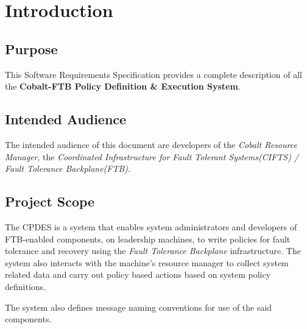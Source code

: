 \section{Introduction}
\subsection{Purpose}
This Software Requirements Specification provides a complete
description of all the \textbf{Cobalt-FTB Policy Definition \&
  Execution System}.

\subsection{Intended Audience}
The intended audience of this document are developers of the
\emph{Cobalt Resource Manager}, the \emph{Coordinated Infrastructure
  for Fault Tolerant Systems(CIFTS) / Fault Tolerance Backplane(FTB)}.

\subsection{Project Scope}
The CPDES is a system that enables system administrators and
developers of FTB-enabled components, on leadership machines, to write
policies for fault tolerance and recovery using the \emph{Fault
  Tolerance Backplane} infrastructure. The system also interacts with
the machine's resource manager to collect system related data and
carry out policy based actions based on system policy definitions.

The system also defines message naming conventions for use of the said
components.
